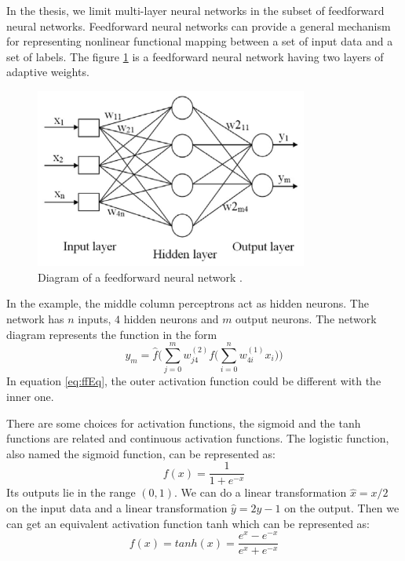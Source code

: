 In the thesis, we limit multi-layer neural networks in the subset of feedforward neural networks. Feedforward neural networks can provide a general mechanism for representing nonlinear functional mapping between a set of input data and a set of labels. The figure \ref{fig:ffnet} is a feedforward neural network having two layers of adaptive weights.

\begin{figure}[!htb]
\centering
\includegraphics[width=0.8\textwidth]{Figure2-2.png}
\caption{\label{fig:ffnet}Diagram of a feedforward neural network \citep{zainal2013oil}.}
\end{figure}

In the example, the middle column perceptrons act as hidden neurons. The network has $n$ inputs, $4$ hidden neurons and $m$ output neurons. The network diagram represents the function in the form
\begin{equation}\label{eq:ffEq}
y_{m} = \hat{f}\Big(\sum_{j=0}^{m}w_{j4}^{(2)}f\big(\sum_{i=0}^{n}w_{4i}^{(1)}x_{i}\big)\Big)
\end{equation}
In equation \ref{eq:ffEq}, the outer activation function could be different with the inner one.

There are some choices for activation functions, the sigmoid and the tanh functions are related and continuous activation functions. The logistic function, also named the sigmoid function, can be represented as: 
\begin{equation}\label{eq:sigmoid}
f(x) = \frac{1}{1+e^{-x}}
\end{equation}
Its outputs lie in the range $(0,1)$. We can do a linear transformation $\hat{x}=x/2$ on the input data and a linear transformation $\hat{y}=2y-1$ on the output. Then we can get an equivalent activation function tanh which can be represented as:
\begin{equation}\label{eq:tanh}
f(x) = tanh(x) = \frac{e^{x}-e^{-x}}{e^{x}+e^{-x}}
\end{equation}


